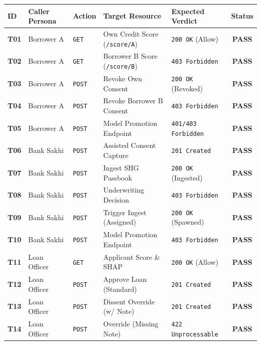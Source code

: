 \documentclass[11pt,a4paper,oneside]{report}
\begin{document}
\begin{table}[H]
\centering
\small
\renewcommand{\arraystretch}{1.15}
\begin{tabularx}{\textwidth}{l p{2.2cm} p{1.6cm} p{3.2cm} p{2.4cm} c}
  \toprule
  \textbf{ID} & \textbf{Caller Persona} & \textbf{Action} & \textbf{Target Resource} & \textbf{Expected Verdict} & \textbf{Status} \\
  \midrule
  \textbf{T01} & Borrower A & \texttt{GET} & Own Credit Score (\texttt{/score/A}) & \texttt{200 OK} (Allow) & \textbf{PASS} \\
  \textbf{T02} & Borrower A & \texttt{GET} & Borrower B Score (\texttt{/score/B}) & \texttt{403 Forbidden} & \textbf{PASS} \\
  \textbf{T03} & Borrower A & \texttt{POST} & Revoke Own Consent & \texttt{200 OK} (Revoked) & \textbf{PASS} \\
  \textbf{T04} & Borrower A & \texttt{POST} & Revoke Borrower B Consent & \texttt{403 Forbidden} & \textbf{PASS} \\
  \textbf{T05} & Borrower A & \texttt{POST} & Model Promotion Endpoint & \texttt{401/403 Forbidden}& \textbf{PASS} \\
  \addlinespace
  \textbf{T06} & Bank Sakhi & \texttt{POST} & Assisted Consent Capture & \texttt{201 Created} & \textbf{PASS} \\
  \textbf{T07} & Bank Sakhi & \texttt{POST} & Ingest SHG Passbook & \texttt{200 OK} (Ingested)& \textbf{PASS} \\
  \textbf{T08} & Bank Sakhi & \texttt{POST} & Underwriting Decision & \texttt{403 Forbidden} & \textbf{PASS} \\
  \textbf{T09} & Bank Sakhi & \texttt{POST} & Trigger Ingest (Assigned) & \texttt{200 OK} (Spawned) & \textbf{PASS} \\
  \textbf{T10} & Bank Sakhi & \texttt{POST} & Model Promotion Endpoint & \texttt{403 Forbidden} & \textbf{PASS} \\
  \addlinespace
  \textbf{T11} & Loan Officer & \texttt{GET} & Applicant Score \& SHAP & \texttt{200 OK} (Allow) & \textbf{PASS} \\
  \textbf{T12} & Loan Officer & \texttt{POST} & Approve Loan (Standard) & \texttt{201 Created} & \textbf{PASS} \\
  \textbf{T13} & Loan Officer & \texttt{POST} & Dissent Override (w/ Note) & \texttt{201 Created} & \textbf{PASS} \\
  \textbf{T14} & Loan Officer & \texttt{POST} & Override (Missing Note) & \texttt{422 Unprocessable} & \textbf{PASS} \\

\end{tabularx}
\end{table}
\end{document}

